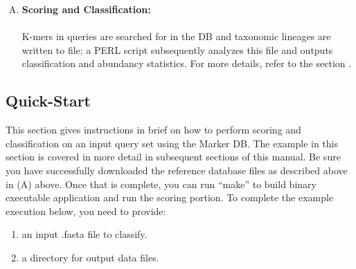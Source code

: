 \documentclass[11pt]{article}
\begin{document}
\begin{enumerate}[A.]
{\begin{quote}
  {\it Tip:} If a ramdisk is not available on a large (512GB+) server,
  we recommend that the database be ``precopied'' into the system's
  buffer cache (from network attached or local HDD storage) prior to
  running LMAT.  LMAT uses memory mapped files so pages in the
  database are loaded on demand.  Regular system prefetching of pages
  under the memory-mapped approach is slow unless run from an SSD.
  The effectiveness of precopy can depend on your system's buffer
  cache policy: some evict pages early so the buffer will not hold the
  LMAT database from the precopy to the following LMAT execution.  To
  perform the ``precopy'':

 \texttt{\% cat <database-filename> > /dev/null}.
\end{quote}

}
  \item
{


  {\bf Scoring and Classification:}\\
  \\
   K-mers in queries are searched for in the DB
     and taxonomic lineages are written to file; a PERL script subsequently
     analyzes this file and outputs classification and abundancy statistics.  For more details, refer to the section .
}
\end{enumerate}

\subsection{Quick-Start}
\label{sec:quick-start}

This section gives instructions in brief on how to perform scoring and classification on an input query set using the Marker DB.  The example in this section is covered in more detail in subsequent sections of this manual.   Be sure you have successfully downloaded the reference database files as described above in  (A) above. Once that is complete, you can run ``make'' to build binary executable application and run the scoring portion.  To complete the example execution below, you need to provide: 

\begin{enumerate}[(1)]
\item 
{
 an input .fasta file to classify. 
 }
 \item
{ 
 a directory for output data files.
 }
\end{enumerate}
\end{document}
